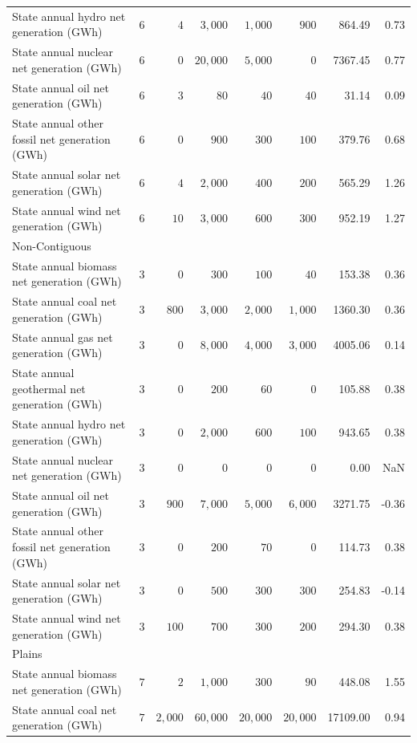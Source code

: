 \documentclass[
]{article}
\begin{document}
\begin{longtable}{lrrrrrrr}
State annual hydro net generation (GWh) & $6$ & $4$ & $3,000$ & $1,000$ & $900$ & 864.49 & 0.73 \\ 
State annual nuclear net generation (GWh) & $6$ & $0$ & $20,000$ & $5,000$ & $0$ & 7367.45 & 0.77 \\ 
State annual oil net generation (GWh) & $6$ & $3$ & $80$ & $40$ & $40$ & 31.14 & 0.09 \\ 
State annual other fossil net generation (GWh) & $6$ & $0$ & $900$ & $300$ & $100$ & 379.76 & 0.68 \\ 
State annual solar net generation (GWh) & $6$ & $4$ & $2,000$ & $400$ & $200$ & 565.29 & 1.26 \\ 
State annual wind net generation (GWh) & $6$ & $10$ & $3,000$ & $600$ & $300$ & 952.19 & 1.27 \\ 
\midrule
\multicolumn{8}{l}{Non-Contiguous} \\ 
\midrule
State annual biomass net generation (GWh) & $3$ & $0$ & $300$ & $100$ & $40$ & 153.38 & 0.36 \\ 
State annual coal net generation (GWh) & $3$ & $800$ & $3,000$ & $2,000$ & $1,000$ & 1360.30 & 0.36 \\ 
State annual gas net generation (GWh) & $3$ & $0$ & $8,000$ & $4,000$ & $3,000$ & 4005.06 & 0.14 \\ 
State annual geothermal net generation (GWh) & $3$ & $0$ & $200$ & $60$ & $0$ & 105.88 & 0.38 \\ 
State annual hydro net generation (GWh) & $3$ & $0$ & $2,000$ & $600$ & $100$ & 943.65 & 0.38 \\ 
State annual nuclear net generation (GWh) & $3$ & $0$ & $0$ & $0$ & $0$ & 0.00 & NaN \\ 
State annual oil net generation (GWh) & $3$ & $900$ & $7,000$ & $5,000$ & $6,000$ & 3271.75 & -0.36 \\ 
State annual other fossil net generation (GWh) & $3$ & $0$ & $200$ & $70$ & $0$ & 114.73 & 0.38 \\ 
State annual solar net generation (GWh) & $3$ & $0$ & $500$ & $300$ & $300$ & 254.83 & -0.14 \\ 
State annual wind net generation (GWh) & $3$ & $100$ & $700$ & $300$ & $200$ & 294.30 & 0.38 \\ 
\midrule
\multicolumn{8}{l}{Plains} \\ 
\midrule
State annual biomass net generation (GWh) & $7$ & $2$ & $1,000$ & $300$ & $90$ & 448.08 & 1.55 \\ 
State annual coal net generation (GWh) & $7$ & $2,000$ & $60,000$ & $20,000$ & $20,000$ & 17109.00 & 0.94 \\ 

\end{longtable}
\end{document}
